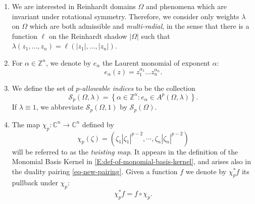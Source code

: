 \documentclass[letterpaper,11pt,reqno]{amsart}
\theoremstyle{plain}
\theoremstyle{definition}
\theoremstyle{remark}
\theoremstyle{remark}
\numberwithin{equation}{section}
\newcommand{\abs}[1]{\left\vert#1\right\vert}
\newcommand{\cs}{{\mathcal S}}
\newcommand{\cx}{{\mathbb C}}
\newcommand{\Z}{{\mathbb Z}}
\begin{document}
\begin{enumerate}[wide]
If $\lambda$ is an admissible weight on $U$, a standard argument shows that $A^p(U, \lambda)$ is a closed subspace of $L^p(U,\lambda)$, and therefore a Banach space. 
It is called a \emph{weighted Bergman space}.

\item We are interested in Reinhardt domains $\Omega$ and phenomena which are invariant under rotational symmetry. 
Therefore, we consider only weights $\lambda$ on $\Omega$ which are both admissible and \emph{multi-radial}, in the sense that there is a function $\ell$ on the Reinhardt shadow $\abs{\Omega}$ such that $\lambda(z_1,\dots, z_n)=\ell(\abs{z_1},\dots, \abs{z_n})$.

\item For $\alpha\in \Z^n$, we denote by $e_\alpha$ the Laurent monomial of exponent $\alpha$:
\begin{equation}\label{E:def-of-monomial-e_alpha}
e_\alpha(z)=z_1^{\alpha_1}\dots z_n^{\alpha_n}.
\end{equation}

\item We define the set of {\em $p$-allowable indices} to be the collection
\begin{equation}\label{E:def-of-p-allowable-indicies}
\mathcal{S}_p(\Omega,\lambda) = 
\left\{\alpha\in \Z^n: e_\alpha\in A^p(\Omega, \lambda)\right\}.
\end{equation}
If $\lambda \equiv 1$, we abbreviate $\cs_p(\Omega,1)$ by  $\cs_p(\Omega)$. 

\item The map $\chi_p:\cx^n\to \cx^n$ defined by
\begin{equation}\label{eq-chip}
\chi_p(\zeta) = \left(\zeta_1\abs{\zeta_1}^{p-2},\cdots,{\zeta}_n\abs{\zeta_n}^{p-2}\right)
\end{equation}
will be referred to as the \emph{twisting map}. 
It appears in the definition of the Monomial Basis Kernel in \eqref{E:def-of-monomial-basis-kernel}, and arises also in the duality pairing \eqref{eq-new-pairing}.   
Given a function $f$ we denote by $\chi_p^*f$ its pullback under $\chi_p$:
\begin{equation}\label{eq-chipstar}
    \chi_p^* f = f \circ \chi_p.
\end{equation}
\end{enumerate}
\end{document}
